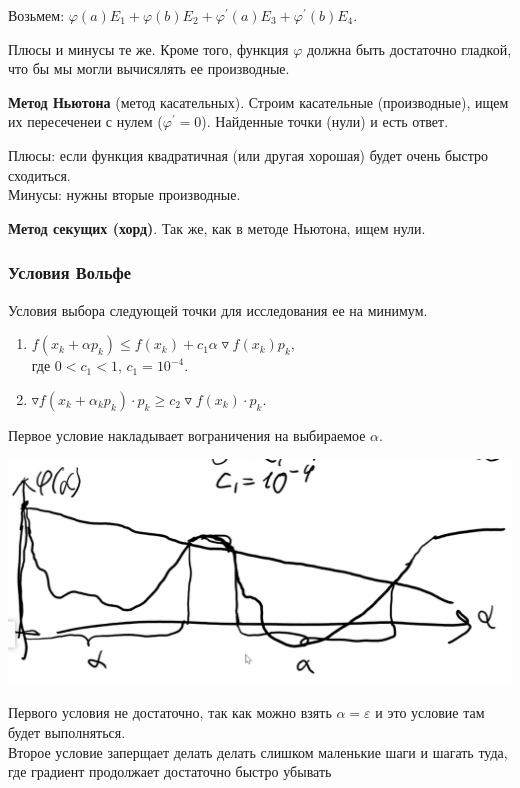 Возьмем:
$\varphi(a) E_1 + \varphi (b) E_2 + \varphi^\prime (a) E_3 + \varphi^\prime (b) E_4$.

Плюсы и минусы те же.
Кроме того, функция $\varphi$ должна быть достаточно гладкой, что бы мы могли вычисялять ее производные.

\textbf{Метод Ньютона} (метод касательных).
Строим касательные (производные), ищем их пересеченеи с нулем ($\varphi^\prime = 0$).
Найденные точки (нули) и есть ответ.

Плюсы: если функция квадратичная (или другая хорошая) будет очень быстро сходиться.\\
Минусы: нужны вторые производные.

\textbf{Метод секущих (хорд)}.
Так же, как в методе Ньютона, ищем нули.

\subsubsection{Условия Вольфе}

Условия выбора следующей точки для исследования ее на минимум.

\begin{enumerate}
    \item $f(x_k + \alpha p_k) \leqslant f(x_k) + c_1 \alpha \triangledown f (x_k) p_k$,\\
    где $0 < c_1 < 1$, $c_1 = 10^{-4}$.
    \item $\triangledown f(x_k + \alpha_k p_k) \cdot p_k \geqslant c_2 \triangledown f(x_k) \cdot p_k$.
\end{enumerate}

Первое условие накладывает вограничения на выбираемое $\alpha$.
\begin{center}
    \includegraphics[scale=0.4]{img/methopt_volfe_conditions_1}
\end{center}

Первого условия не достаточно, так как можно взять $\alpha = \varepsilon$ и это условие там будет выполняться. \\
Второе условие заперщает делать делать слишком маленькие шаги и шагать туда, где градиент продолжает достаточно быстро убывать


